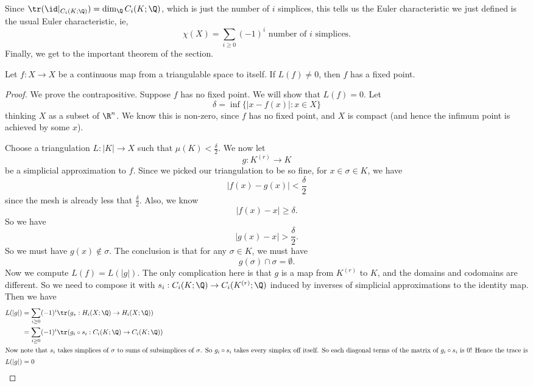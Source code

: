\documentclass[a4paper]{article}
\begin{document}
Since $\tr (\id|_{C_i(K; \Q)}) = \dim_\Q C_i(K; \Q)$, which is just the number of $i$ simplices, this tells us the Euler characteristic we just defined is the usual Euler characteristic, ie,
\[
  \chi(X) = \sum_{i \geq 0} (-1)^i \text{ number of $i$ simplices}.
\]
Finally, we get to the important theorem of the section.
\begin{thm}
  Let $f: X \to X$ be a continuous map from a triangulable space to itself. If $L(f) \not= 0$, then $f$ has a fixed point.
\end{thm}

\begin{proof}
  We prove the contrapositive. Suppose $f$ has no fixed point. We will show that $L(f) = 0$. Let
  \[
    \delta = \inf \{ |x - f(x)|: x \in X\}
  \]
  thinking $X$ as a subset of $\R^n$. We know this is non-zero, since $f$ has no fixed point, and $X$ is compact (and hence the infimum point is achieved by some $x$).

  Choose a triangulation $L: |K| \to X$ such that $\mu(K) < \frac{\delta}{2}$. We now let
  \[
    g: K^{(r)} \to K
  \]
  be a simplicial approximation to $f$. Since we picked our triangulation to be so fine, for $x \in \sigma \in K$, we have
  \[
    |f(x) - g(x)| < \frac{\delta}{2}
  \]
  since the mesh is already less that $\frac{\delta}{2}$. Also, we know
  \[
    |f(x) - x| \geq \delta.
  \]
  So we have
  \[
    |g(x) - x| > \frac{\delta}{2}.
  \]
  So we must have $g(x) \not\in \sigma$. The conclusion is that for any $\sigma \in K$, we must have
  \[
    g(\sigma) \cap \sigma = \emptyset.
  \]
  Now we compute $L(f) = L(|g|)$. The only complication here is that $g$ is a map from $K^{(r)}$ to $K$, and the domains and codomains are different. So we need to compose it with $s_i: C_i(K; \Q) \to C_i(K^{(r)}; \Q)$ induced by inverses of simplicial approximations to the identity map. Then we have
  \begin{align*}
    L(|g|) &= \sum_{i \geq 0} (-1)^i \tr(g_*: H_i(X; \Q) \to H_i(X; \Q))\\
    &= \sum_{i \geq 0} (-1)^i \tr(g_i \circ s_i: C_i(K; \Q) \to C_i(K; \Q))\\
    \intertext{Now note that $s_i$ takes simplices of $\sigma$ to sums of subsimplices of $\sigma$. So $g_i \circ s_i$ takes every simplex off itself. So each diagonal terms of the matrix of $g_i \circ s_i$ is $0$! Hence the trace is}
    L(|g|) &= 0
  \end{align*}
\end{proof}
\end{document}
